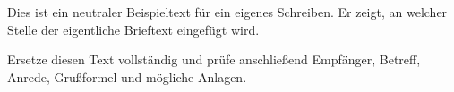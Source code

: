 \begin{LetterBody}

Dies ist ein neutraler Beispieltext für ein eigenes Schreiben. Er zeigt, an welcher Stelle der eigentliche Brieftext eingefügt wird.

Ersetze diesen Text vollständig und prüfe anschließend Empfänger, Betreff, Anrede, Grußformel und mögliche Anlagen.


\end{LetterBody}

